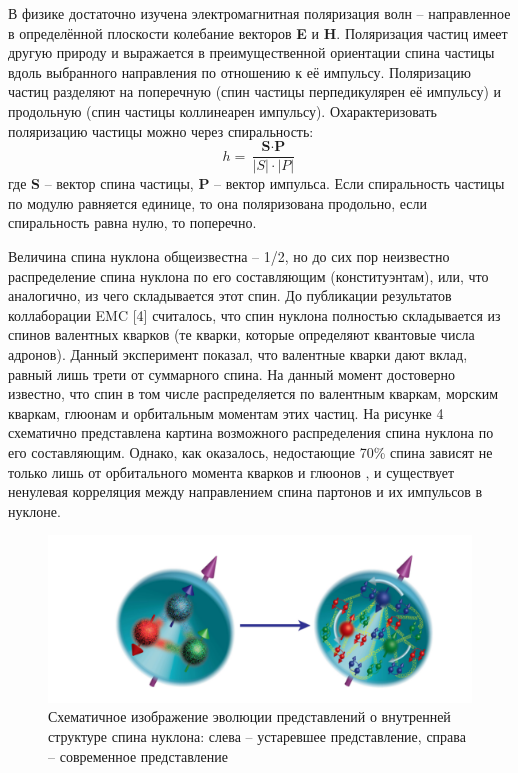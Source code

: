 \documentclass{extarticle}
\begin{document}
 В физике достаточно изучена электромагнитная поляризация волн – направленное в определённой плоскости колебание векторов \textbf{E} и \textbf{H}. Поляризация частиц имеет другую природу и выражается в преимущественной ориентации спина частицы вдоль выбранного направления по отношению к её импульсу. Поляризацию частиц разделяют на поперечную (спин частицы перпедикулярен её импульсу) и продольную (спин частицы коллинеарен импульсу). 
 Охарактеризовать поляризацию частицы можно через спиральность:
 \begin{equation}
     h = \frac{\textbf{S} \cdot \textbf{P}}{|S|\cdot |P|}
 \end{equation}
где \textbf{S} – вектор спина частицы, \textbf{P} – вектор импульса. Если спиральность частицы по модулю равняется единице, то она поляризована продольно, если спиральность равна нулю, то поперечно. 


 Величина спина нуклона общеизвестна – 1/2, но до сих пор неизвестно распределение спина нуклона по его составляющим (конституэнтам), или, что аналогично, из чего складывается этот спин. До публикации результатов коллаборации EMC [4] считалось, что спин нуклона полностью складывается из спинов валентных кварков (те кварки, которые определяют квантовые числа адронов). Данный эксперимент показал, что валентные кварки дают вклад, равный лишь трети от суммарного спина. На данный момент достоверно известно, что спин в том числе распределяется по валентным кваркам, морским кваркам, глюонам и орбитальным моментам этих частиц. На рисунке 4 схематично представлена картина возможного распределения спина нуклона по его составляющим.
 Однако, как оказалось, недостающие 70\% спина зависят не только лишь от орбитального момента кварков и глюонов \cite{Hagler}, и существует ненулевая корреляция между направлением спина партонов и их импульсов в нуклоне. 

\begin{figure}[ht]
    \centering
    \includegraphics[width = 0.9\linewidth]{nucleo.png}
    \caption{Схематичное изображение эволюции представлений о внутренней структуре спина нуклона: слева – устаревшее представление, справа – современное представление}
    \label{fig:nucleo}
\end{figure}
 
\end{document}
